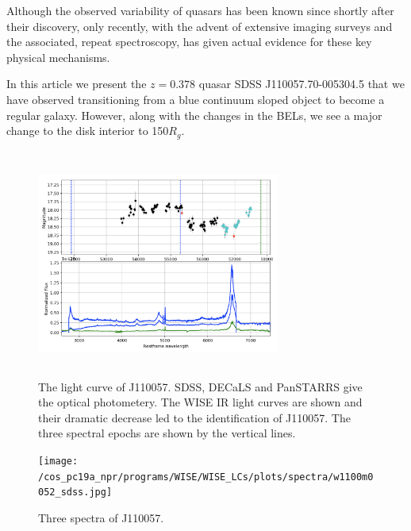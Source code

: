 \documentclass{nature}
\begin{document}
Although the observed variability of quasars has been known since
shortly after their discovery, only recently, with the advent of
extensive imaging surveys and the associated, repeat spectroscopy, has
given actual evidence for these key physical mechanisms.

In this article we present the $z=0.378$ quasar SDSS
J110057.70-005304.5 that we have observed transitioning from a blue
continuum sloped object to become a regular galaxy. However, along
with the changes in the BELs, we see a major change to the disk
interior to 150$R_{g}$.
 

\begin{figure}
  \centering
  \includegraphics[width=8.00cm, height=7.50cm, trim=0.0cm 0.0cm 0.0cm 0.0cm, clip] {J110057_CRTS_lightcurve_v0pnt1.png}
  \caption[]{The light curve of J110057. SDSS, DECaLS and PanSTARRS
give the optical photometery. The WISE IR light curves are shown and
their dramatic decrease led to the identification of J110057. The
three spectral epochs are shown by the vertical lines.}
  \label{fig:J110057_LC_CRTS}
\end{figure}

\begin{figure}
  \texttt{[image: /cos\_pc19a\_npr/programs/WISE/WISE\_LCs/plots/spectra/w1100m0052\_sdss.jpg]}
  \centeringl
  \caption[]{Three spectra of J110057. }
  \label{fig:J110057_spectra}
\end{figure}
\end{document}
